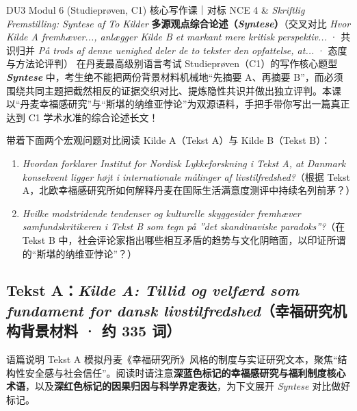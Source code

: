 {DU3 Modul 6 (Studieprøven, C1) 核心写作课｜对标 NCE 4 \& \textit{Skriftlig Fremstilling: Syntese af To Kilder}}
{\textbf{多源观点综合论述（\textit{Syntese}）}（交叉对比 \textit{Hvor Kilde A fremhæver..., anlægger Kilde B et markant mere kritisk perspektiv...} · 共识归并 \textit{På trods af denne uenighed deler de to tekster den opfattelse, at...} · 态度与方法论评判）}
{在丹麦最高级别语言考试 Studieprøven（C1）的写作核心题型 \textbf{\textit{Syntese}} 中，考生绝不能把两份背景材料机械地“先摘要 A、再摘要 B”，而必须围绕共同主题把截然相反的证据交织对比、提炼隐性共识并做出独立评判。本课以“丹麦幸福感研究”与“斯堪的纳维亚悖论”为双源语料，手把手带你写出一篇真正达到 C1 学术水准的综合论述长文！}

\begin{foerduleaeser}
带着下面两个宏观问题对比阅读 Kilde A（Tekst A）与 Kilde B（Tekst B）：
\begin{enumerate}
  \item \textit{Hvordan forklarer Institut for Nordisk Lykkeforskning i Tekst A, at Danmark konsekvent ligger højt i internationale målinger af livstilfredshed?}（根据 Tekst A，北欧幸福感研究所如何解释丹麦在国际生活满意度测评中持续名列前茅？）
  \item \textit{Hvilke modstridende tendenser og kulturelle skyggesider fremhæver samfundskritikeren i Tekst B som tegn på ”det skandinaviske paradoks”?}（在 Tekst B 中，社会评论家指出哪些相互矛盾的趋势与文化阴暗面，以印证所谓的“斯堪的纳维亚悖论”？）
\end{enumerate}
\end{foerduleaeser}


\subsection*{Tekst A：\textit{Kilde A: Tillid og velfærd som fundament for dansk livstilfredshed}（幸福研究机构背景材料 · 约 335 词）}

\begin{tipbox}{语篇说明}
Tekst A 模拟丹麦《幸福研究所》风格的制度与实证研究文本，聚焦“结构性安全感与社会信任”。阅读时请注意\textbf{\color{NCDNavy}深蓝色标记的幸福感研究与福利制度核心术语}，以及\textbf{\color{NCDRed}深红色标记的因果归因与科学界定表达}，为下文展开 \textit{Syntese} 对比做好标记。
\end{tipbox}

